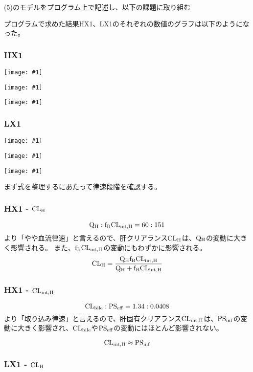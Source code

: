 \documentclass[a4paper,papersize,dvipdfmx]{jsarticle}
\newcommand{\pict}[2]{\begin{center} \texttt{[image: \#1]} \end{center}}   %
\begin{document}
\begin{tcolorbox}[colback=white,colbacktitle=black!10!white,coltitle=black,title={(6)}]
(5)のモデルをプログラム上で記述し、以下の課題に取り組む
\end{tcolorbox}

プログラムで求めた結果HX1、LX1のそれぞれの数値のグラフは以下のようになった。

\subsubsection*{HX1}
\pict{imgs/hx1_cv.png}{8}
\pict{imgs/hx1_ch.png}{8}
\pict{imgs/hx1_xb.png}{8}

\subsubsection*{LX1}
\pict{imgs/lx1_cv.png}{8}
\pict{imgs/lx1_ch.png}{8}
\pict{imgs/lx1_xb.png}{8}

まず式を整理するにあたって律速段階を確認する。

\subsubsection*{HX1 - $\rm CL_H$}
\[\rm Q_H: f_B CL_{int,H}= 60 :151\]
より「やや血流律速」と言えるので、肝クリアランス$\rm CL_{H}$は、$\rm Q_H$の変動に大きく影響される。  また、$\rm f_B CL_{int,H}$の変動にもわずかに影響される。
\begin{equation}
\rm CL_H = \frac{Q_H f_B CL_{int,H}}{Q_H +  f_B CL_{int,H}}
\label{eq:hx1_clh}
\end{equation}

\subsubsection*{HX1 - $\rm CL_{int,H}$}

\[\rm CL_{bile}: PS_{eff}= 1.34 :0.0408\]
より「取り込み律速」と言えるので、肝固有クリアランス$\rm CL_{int,H}$は、$\rm PS_{inf}$の変動に大きく影響され、$\rm CL_{bile}$や$\rm PS_{eff}$の変動にはほとんど影響されない。

\begin{equation}
\rm CL_{int,H} \approx  PS_{inf}
\label{eq:hx1_clinth}
\end{equation}

\subsubsection*{LX1 - $\rm CL_H$}
\end{document}
